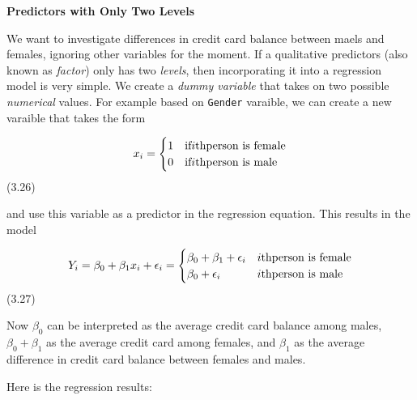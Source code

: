 \documentclass[
  letterpaper,
  DIV=11,
  numbers=noendperiod]{scrreprt}
\newenvironment{Shaded}{\begin{snugshade}}{\end{snugshade}}
\newcommand{\AttributeTok}[1]{\textcolor[rgb]{0.65,0.35,0.00}{#1}}
\newcommand{\FunctionTok}[1]{\textcolor[rgb]{0.02,0.16,0.49}{#1}}
\newcommand{\NormalTok}[1]{\textcolor[rgb]{0.33,0.33,0.33}{#1}}
\newcommand{\OtherTok}[1]{\textcolor[rgb]{0.85,0.12,0.09}{#1}}
\newcommand{\SpecialCharTok}[1]{\textcolor[rgb]{0.00,0.46,0.62}{#1}}
\newcommand{\StringTok}[1]{\textcolor[rgb]{0.00,0.50,0.00}{#1}}
\begin{document}
\textbf{Predictors with Only Two Levels}

We want to investigate differences in credit card balance between maels
and females, ignoring other variables for the moment. If a qualitative
predictors (also known as \emph{factor}) only has two \emph{levels},
then incorporating it into a regression model is very simple. We create
a \emph{dummy variable} that takes on two possible \emph{numerical}
values. For example based on \texttt{Gender} varaible, we can create a
new varaible that takes the form

\[
x_i = 
\begin{cases}
1 & \text{if}\space i\text{th} \space\text{person is female} \\
0 & \text{if}\space i\text{th} \space\text{person is male}
\end{cases}
\] (3.26)

and use this variable as a predictor in the regression equation. This
results in the model

\[
Y_i = \beta_0 + \beta_1x_i + \epsilon_i = 
\begin{cases}
\beta_0 + \beta_1 + \epsilon_i & i\text{th} \space\text{person is female} \\
\beta_0 + \epsilon_i & i\text{th} \space\text{person is male}
\end{cases}
\] (3.27)

Now \(\beta_0\) can be interpreted as the average credit card balance
among males, \(\beta_0 + \beta_1\) as the average credit card among
females, and \(\beta_1\) as the average difference in credit card
balance between females and males.

Here is the regression results:

\begin{Shaded}
\end{Shaded}
\end{document}

